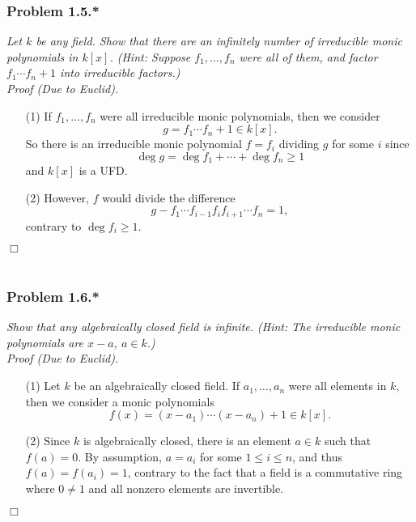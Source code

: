 \documentclass{article}
\begin{document}
\subsubsection*{Problem 1.5.*}
\emph{Let $k$ be any field.
Show that there are an infinitely number of irreducible monic polynomials in $k[x]$.
(Hint: Suppose $f_1,\ldots,f_n$ were all of them, and factor $f_1\cdots f_n+1$ into irreducible factors.)} \\

\emph{Proof (Due to Euclid).}
\begin{enumerate}
\item[(1)]
  If
  $f_1, \ldots, f_n$ were all irreducible monic polynomials, then
  we consider
  \[
    g = f_1 \cdots f_n + 1 \in k[x].
  \]
  So there is an irreducible monic polynomial $f = f_i$ dividing $g$ for some $i$
  since
  \[
    \deg g = \deg f_1 + \cdots + \deg f_n \geq 1
  \]
  and $k[x]$ is a UFD.

\item[(2)]
  However, $f$ would divide the difference
  \[
    g - f_1 \cdots f_{i-1} f_i f_{i+1} \cdots f_n = 1,
  \]
  contrary to $\deg f_i \geq 1$.
\end{enumerate}
$\Box$ \\\\






\subsubsection*{Problem 1.6.*}
\emph{Show that any algebraically closed field is infinite.
(Hint: The irreducible monic polynomials are $x - a$, $a \in k$.)} \\

\emph{Proof (Due to Euclid).}
\begin{enumerate}
\item[(1)]
  Let $k$ be an algebraically closed field.
  If $a_1, \ldots, a_n$ were all elements in $k$, then
  we consider a monic polynomials
  \[
    f(x) = (x - a_1) \cdots (x - a_n) + 1 \in k[x].
  \]

\item[(2)]
  Since $k$ is algebraically closed,
  there is an element $a \in k$ such that $f(a) = 0$.
  By assumption, $a = a_i$ for some $1 \leq i \leq n$,
  and thus $f(a) = f(a_i) = 1$, contrary to the fact that
  a field is a commutative ring where $0 \neq 1$ and all nonzero elements are invertible.
\end{enumerate}
$\Box$ \\\\
\end{document}
